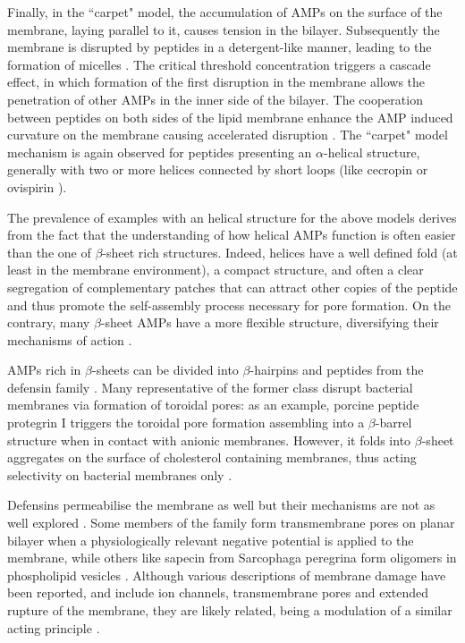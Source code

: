 Finally, in the ``carpet" model, the accumulation of AMPs on the surface of the membrane, laying parallel to it, causes tension in the bilayer. Subsequently the membrane is disrupted by peptides in a detergent-like manner, leading to the formation of micelles \cite{Shai1999,Ladokhin2001}.
%
The critical threshold concentration triggers a cascade effect, in which formation of the first disruption in the membrane allows the penetration of other AMPs in the inner side of the bilayer. The cooperation between peptides on both sides of the lipid membrane enhance the AMP induced curvature on the membrane causing accelerated disruption \cite{Oren1998}.
%
The ``carpet" model mechanism is again observed for peptides presenting an $\alpha$-helical structure, generally with two or more helices connected by short loops (like cecropin \cite{Gazit1995} or ovispirin \cite{Yamaguchi2001}).

The prevalence of examples with an helical structure for the above models derives from the fact that the understanding of how helical AMPs function is often easier than the one of $\beta$-sheet rich structures.
%
Indeed, helices have a well defined fold (at least in the membrane environment), a compact structure, and often a clear segregation of complementary patches that can attract other copies of the peptide and thus promote the self-assembly process necessary for pore formation. On the contrary, many $\beta$-sheet AMPs have a more flexible structure, diversifying their mechanisms of action \cite{??}.

AMPs rich in $\beta$-sheets can be divided into $\beta$-hairpins and peptides from the defensin family \cite{Nguyen2011}.
%
Many representative of the former class disrupt bacterial membranes via formation of toroidal pores: as an example, porcine peptide protegrin I triggers the toroidal pore formation assembling into a $\beta$-barrel structure when in contact with anionic membranes. However, it folds into $\beta$-sheet aggregates on the surface of cholesterol containing membranes, thus acting selectivity on bacterial membranes only \cite{Tang2009}.

Defensins permeabilise the membrane as well but their mechanisms are not as well explored \cite{Lehrer2004,Zasloff2002,Fujii1993}.
%
Some members of the family form transmembrane pores on planar bilayer when a physiologically relevant negative potential is applied to the membrane,\cite{Kagan1990}
%
while others like sapecin from Sarcophaga peregrina form oligomers in phospholipid vesicles \cite{Takeuchi2004}.
%
Although various descriptions of membrane damage have been reported, and include ion channels, transmembrane pores and extended rupture of the membrane, they are likely related, being a modulation of a similar acting principle \cite{Dathe1999}.


